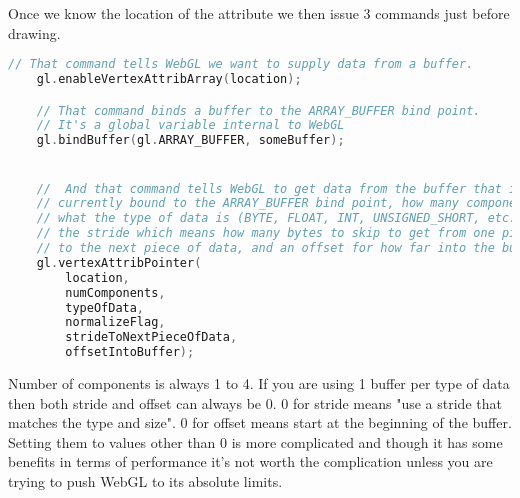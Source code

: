 Once we know the location of the attribute we then issue 3 commands just before drawing.
\begin{lstlisting}[language=c]
    // That command tells WebGL we want to supply data from a buffer.
    gl.enableVertexAttribArray(location);

    // That command binds a buffer to the ARRAY_BUFFER bind point. 
    // It's a global variable internal to WebGL
    gl.bindBuffer(gl.ARRAY_BUFFER, someBuffer);


    //  And that command tells WebGL to get data from the buffer that is 
    // currently bound to the ARRAY_BUFFER bind point, how many components per vertex (1 - 4), 
    // what the type of data is (BYTE, FLOAT, INT, UNSIGNED_SHORT, etc...), 
    // the stride which means how many bytes to skip to get from one piece of data 
    // to the next piece of data, and an offset for how far into the buffer our data is.
    gl.vertexAttribPointer(
        location,
        numComponents,
        typeOfData,
        normalizeFlag,
        strideToNextPieceOfData,
        offsetIntoBuffer);
\end{lstlisting}

Number of components is always 1 to 4. If you are using 1 buffer per type of data then both stride and offset can always be 0. 0 for stride means "use a stride that matches the type and size". 0 for offset means start at the beginning of the buffer. Setting them to values other than 0 is more complicated and though it has some benefits in terms of performance it's not worth the complication unless you are trying to push WebGL to its absolute limits.



